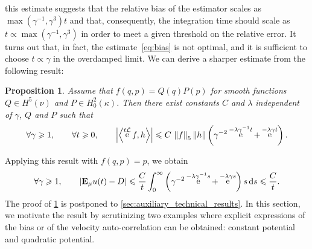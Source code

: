 \documentclass[11pt,a4paper]{article}
\DeclareMathOperator{\e}{e}
\newcommand{\expect}[0]{\mathbf{E}}
\renewcommand{\d}{\mathrm d}
\theoremstyle{plain}
\newtheorem{proposition}{Proposition}[section]
\numberwithin{equation}{section}
\renewcommand{\leq}{\leqslant}
\renewcommand{\geq}{\geqslant}
\begin{document}
this estimate suggests that the relative bias of the estimator scales as $\max(\gamma^{-1}, \gamma^3) t$ and that,
consequently, the integration time should scale as $t \propto \max(\gamma^{-1}, \gamma^3)$ in order to meet a given threshold on the relative error.
It turns out that, in fact, the estimate~\eqref{eq:bias} is not optimal,
and it is sufficient to choose $t \propto \gamma$ in the overdamped limit.
We can derive a sharper estimate from the following result:
\begin{proposition}
    \label{proposition:semigroup_meanzero_observable}
    Assume that $f(q, p) = Q(q) P(p)$ for smooth functions $Q \in H^5(\nu)$ and $P \in H^2_0(\kappa)$.
    Then there exist constants $C$ and $\lambda$ independent of $\gamma$, $Q$ and $P$ such that
    \begin{equation}
        \label{eq:optimal_decay_correlation}
        \forall \gamma \geq 1, \qquad
        \forall t \geq 0, \qquad
        \abs{\ip{\e^{t \mathcal L}f}{h}}
        \leq C \, \norm{f}[5] \norm{h}  \left( \gamma^{-2} \e^{- \lambda \gamma^{-1} t} + \e^{-\lambda  \gamma t} \right).
    \end{equation}
\end{proposition}
Applying this result with $f(q, p) = p$, we obtain
\begin{equation*}
    \forall \gamma \geq 1, \qquad
    \abs{\expect_{\mu} u(t) - D}
    \leq \frac{C}{t}\int_{0}^{\infty} \left( \gamma^{-2} \e^{- \lambda \gamma^{-1} s} + \e^{-\lambda  \gamma s} \right)  s \, \d s
    \leq \frac{C}{t}.
\end{equation*}
The proof of \cref{proposition:semigroup_meanzero_observable} is postponed to \cref{sec:auxiliary_technical_results}.
In this section,
we motivate the result by scrutinizing two examples where
explicit expressions of the bias or of the velocity auto-correlation can be obtained:
constant potential and quadratic potential.
\end{document}
